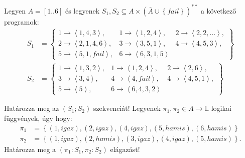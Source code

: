 \documentclass[a4paper,12pt]{article}
\theoremstyle{definition}
\begin{document}
	\newpage
	\begin{question} Legyen $A = [1..6]$ és legyenek $ S_1, S_2 \subseteq A \times \left(\bar{A} \cup \left\{ fail \right\} \right)^{**} $ a következő programok:
		\begin{align*}
			S_1 &=\left\{
			\begin{array}{lll}
				1 \rightarrow \left< 1,4,3 \right>, & 1 \rightarrow \left< 1,2,4 \right>,& 2 \rightarrow \left< 2,2,\dots \right>, \\
				2 \rightarrow \left< 2,1,4,6 \right>,     & 3 \rightarrow \left< 3,5,1 \right>, & 4 \rightarrow \left< 4,5,3 \right>, \\
				5 \rightarrow \left< 5,1,fail \right>,     & 6 \rightarrow \left< 6,3,1,5 \right> &
			\end{array}
			\right\}
			\\[12pt]
			S_2 &=\left\{
			\begin{array}{lll}
				1 \rightarrow \left< 1,3,2 \right>, & 1 \rightarrow \left< 1,2,4 \right>,& 2 \rightarrow \left< 2,6 \right>, \\
				3 \rightarrow \left< 3,4 \right>,     & 4 \rightarrow \left< 4,fail \right>, & 4 \rightarrow \left< 4,5,1 \right>, \\
				5 \rightarrow \left< 5 \right>,     & 6 \rightarrow \left< 6,4,3,2 \right> &
			\end{array}
			\right\}
		\end{align*}
	\begin{tasks}
		\task Határozza meg az $(S_1;S_2)$ szekvenciát!
		\task Legyenek $\pi_1, \pi_2 \in A \rightarrow \mathbb{L}$ logikai függvények, úgy hogy:
		\begin{align*}
			\pi_1&=\left\lbrace (1,igaz),(2,igaz),(4,igaz),(5,hamis),(6,hamis) \right\rbrace \\
			\pi_2&=\left\lbrace (1,igaz),(2,hamis),(3,igaz),(4,igaz),(5,hamis) \right\rbrace.
		\end{align*}
		Határozza meg a $(\pi_1:S_1, \pi_2:S_2)$ elágazást!
	\end{tasks}
	\end{question}
\end{document}
